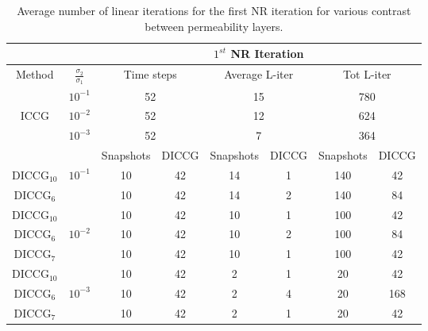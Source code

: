 \documentclass[12pt]{article}
\numberwithin{equation}{section}
\begin{document}
\begin{table}[!ht]\centering
\begin{minipage}{1\textwidth}
\vspace{-10pt}
\centering
\begin{tabular}{ |c|c|c|c|c|c|c|c|} 
  \hline
 & & \multicolumn{6}{|c|}{$1^{st}$ NR Iteration}  \\
\hline
Method& $\frac{\sigma_2}{\sigma_1}$ & \multicolumn{2}{|c|}{Time steps} &\multicolumn{2}{|c|}{Average L-iter} & \multicolumn{2}{|c|}{Tot L-iter}\\
\hline
&$10^{-1}$ &\multicolumn{2}{|c|}{52} & \multicolumn{2}{|c|}{15}& \multicolumn{2}{|c|}{780} \\
ICCG&$10^{-2}$ & \multicolumn{2}{|c|}{52}& \multicolumn{2}{|c|}{12}& \multicolumn{2}{|c|}{624}\\
&$10^{-3}$ & \multicolumn{2}{|c|}{52} &\multicolumn{2}{|c|}{7} & \multicolumn{2}{|c|}{364}\\
\hline
&&Snapshots&DICCG&Snapshots&DICCG&Snapshots&DICCG\\
\hline
DICCG$_{10}$&$10^{-1}$ &10&42 &14&1 &140&42 \\
DICCG$_6$& &10&42 &14&2 &140&84 \\
\hline
DICCG$_{10}$& &10&42 & 10&1& 100&42\\
DICCG$_6$&$10^{-2}$ &10&42 & 10&2& 100&84\\
DICCG$_7$& &10&42 & 10&1& 100&42\\
\hline
DICCG$_{10}$& & 10&42 & 2&1&20&42 \\
DICCG$_6$&$10^{-3}$ & 10&42 & 2&4&20&168 \\
DICCG$_7$& & 10&42 & 2&1&20&42 \\
 \hline
 \end{tabular}
\caption{Average number of linear iterations for the first NR iteration for various contrast between permeability layers. }\label{table:liter1}
\end{minipage}
\end{table}
\end{document}

